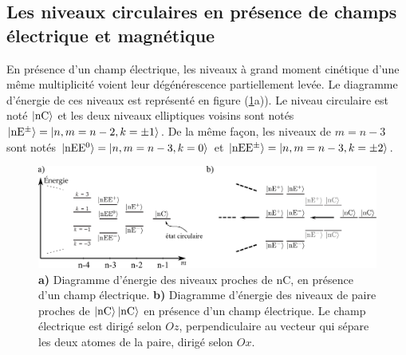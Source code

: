 \subsection{Les niveaux circulaires en présence de champs électrique et magnétique}\label{subsec:circulars_in_fieds}
\noindent En présence d'un champ électrique, les niveaux à grand moment cinétique d'une même multiplicité voient leur dégénérescence partiellement levée.
Le diagramme d'énergie de ces niveaux est représenté en figure (\ref{fig:ener_StarknC_nCnC}a)).
Le niveau circulaire est noté $\ket{\mathrm{nC}}$ et les deux niveaux \og elliptiques \fg{} voisins sont notés $\ket{\mathrm{nE^{\pm}}} = \ket{n,m=n-2,k=\pm1}$.
De la même façon, les niveaux de $m=n-3$ sont notés $\ket{\mathrm{nEE^0}} = \ket{n,m=n-3,k=0}$ et $\ket{\mathrm{nEE^{\pm}}} = \ket{n,m=n-3,k=\pm 2}$.
%
\begin{figure}[!h]
\centering
\includegraphics[width=\linewidth]{figures/circsim/diagram_nC_nCnC}
\caption[Diagammre d'énergie des niveaux proches du $\mathrm{50C}$]{
\textbf{a)} Diagramme d'énergie des niveaux proches de $\mathrm{nC}$, en présence d'un champ électrique.
\textbf{b)} Diagramme d'énergie des niveaux de paire proches de $\ket{\mathrm{nC}}\ket{\mathrm{nC}}$ en présence d'un champ électrique.
Le champ électrique est dirigé selon $Oz$, perpendiculaire au vecteur qui sépare les deux atomes de la paire,  dirigé selon $Ox$.
}
\label{fig:ener_StarknC_nCnC}
\end{figure}


